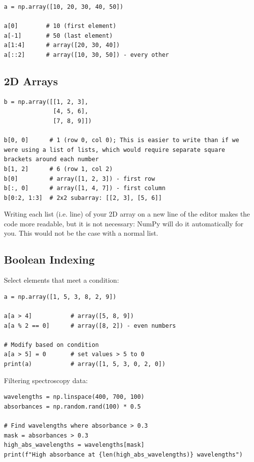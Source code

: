 \begin{lstlisting}
a = np.array([10, 20, 30, 40, 50])

a[0]        # 10 (first element)
a[-1]       # 50 (last element)
a[1:4]      # array([20, 30, 40])
a[::2]      # array([10, 30, 50]) - every other
\end{lstlisting}

\subsection{2D Arrays}

\begin{lstlisting}
b = np.array([[1, 2, 3],
              [4, 5, 6],
              [7, 8, 9]])

b[0, 0]      # 1 (row 0, col 0); This is easier to write than if we were using a list of lists, which would require separate square brackets around each number
b[1, 2]      # 6 (row 1, col 2)
b[0]         # array([1, 2, 3]) - first row
b[:, 0]      # array([1, 4, 7]) - first column
b[0:2, 1:3]  # 2x2 subarray: [[2, 3], [5, 6]]
\end{lstlisting}

\begin{note}
Writing each list (i.e. line) of your 2D array on a new line of the editor makes the code more readable, but it is not necessary: NumPy will do it automatically for you. This would not be the case with a normal list.
\end{note}

\subsection{Boolean Indexing}

Select elements that meet a condition:

\begin{lstlisting}
a = np.array([1, 5, 3, 8, 2, 9])

a[a > 4]           # array([5, 8, 9])
a[a % 2 == 0]      # array([8, 2]) - even numbers

# Modify based on condition
a[a > 5] = 0       # set values > 5 to 0
print(a)           # array([1, 5, 3, 0, 2, 0])
\end{lstlisting}

\begin{labexample}
Filtering spectroscopy data:

\begin{lstlisting}
wavelengths = np.linspace(400, 700, 100)
absorbances = np.random.rand(100) * 0.5

# Find wavelengths where absorbance > 0.3
mask = absorbances > 0.3
high_abs_wavelengths = wavelengths[mask]
print(f"High absorbance at {len(high_abs_wavelengths)} wavelengths")
\end{lstlisting}
\end{labexample}

